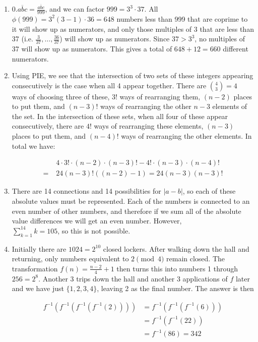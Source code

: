 \documentclass{book}
\numberwithin{equation}{section}
\begin{document}
\begin{enumerate}[label={9.\arabic*}]
\item
$0.\overline{abc} = \frac{\overline{abc}}{999}$, and we can factor $999 = 3^3 \cdot 37$. All $\phi(999) = 3^2(3-1)\cdot36 = 648$
numbers less than 999 that are coprime to it will show up as numerators, and only those multiples of 3 that are less
than 37 (i.e. $\frac{3}{37}, \ldots, \frac{36}{37}$) will show up as numerators. Since $37 > 3^3$, no multiples of 37 will
show up as numerators. This gives a total of $648 + 12 = 660$ different numerators.

\item
Using PIE, we see that the intersection of two sets of these integers appearing consecutively is the case when
all 4 appear together. There are ${4 \choose 3} = 4$ ways of choosing three of these, 3! ways of rearranging them,
$(n-2)$ places to put them, and $(n-3)!$ ways of rearranging the other $n-3$ elements of the set. In the intersection
of these sets, when all four of these appear consecutively, there are $4!$ ways of rearranging these elements,
$(n-3)$ places to put them, and $(n-4)!$ ways of rearranging the other elements. In total we have:

\begin{align*}
& 4\cdot 3! \cdot (n-2)\cdot (n-3)! - 4!\cdot(n-3)\cdot(n-4)! \\
 = \; & 24(n-3)!((n-2) - 1) = 24(n-3)(n-3)!
\end{align*}

\item
There are 14 connections and 14 possibilities for $|a - b|$, so each of these absolute values must be represented.
Each of the numbers is connected to an even number of other numbers, and therefore if we sum all of the
absolute value differences we will get an even number. However, \\
$\sum_{k=1}^{14} k = 105$, so this is not possible.

\item
Initially there are $1024 = 2^{10}$ closed lockers.
After walking down the hall and returning, only numbers equivalent to $2 \pmod{4}$ remain closed. The transformation
$f(n) = \frac{n-2}{4} + 1$ then turns this into numbers 1 through $256 = 2^8$. Another 3 trips down the hall and another
3 applications of $f$ later and we have just $\{1, 2, 3, 4\}$, leaving 2 as the final number. The answer is then

\begin{align*}
f^{-1}(f^{-1}(f^{-1}(f^{-1}(2)))) & = f^{-1}(f^{-1}(f^{-1}(6))) \\
& = f^{-1}(f^{-1}(22)) \\
& = f^{-1}(86) = 342
\end{align*}


\end{enumerate}
\end{document}
